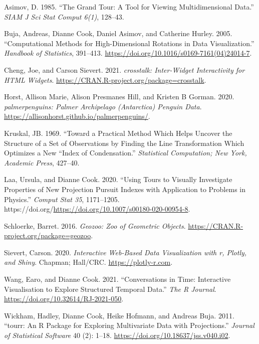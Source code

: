 \hypertarget{refs}{}
\begin{CSLReferences}{1}{0}
\leavevmode{}%
Asimov, D. 1985. {``The Grand Tour: A Tool for Viewing Multidimensional Data.''} \emph{SIAM J Sci Stat Comput 6(1)}, 128--43.

\leavevmode{}%
Buja, Andreas, Dianne Cook, Daniel Asimov, and Catherine Hurley. 2005. {``Computational Methods for High-Dimensional Rotations in Data Visualization.''} \emph{Handbook of Statistics}, 391--413. \url{https://doi.org/10.1016/s0169-7161(04)24014-7}.

\leavevmode{}%
Cheng, Joe, and Carson Sievert. 2021. \emph{{crosstalk}: Inter-Widget Interactivity for HTML Widgets}. \url{https://CRAN.R-project.org/package=crosstalk}.

\leavevmode{}%
Horst, Allison Marie, Alison Presmanes Hill, and Kristen B Gorman. 2020. \emph{{palmerpenguins}: Palmer Archipelago (Antarctica) Penguin Data}. \url{https://allisonhorst.github.io/palmerpenguins/}.

\leavevmode{}%
Kruskal, JB. 1969. {``Toward a Practical Method Which Helps Uncover the Structure of a Set of Observations by Finding the Line Transformation Which Optimizes a New ``Index of Condensation.''} \emph{Statistical Computation; New York, Academic Press}, 427--40.

\leavevmode{}%
Laa, Ursula, and Dianne Cook. 2020. {``Using Tours to Visually Investigate Properties of New Projection Pursuit Indexes with Application to Problems in Physics.''} \emph{Comput Stat 35}, 1171--1205. https://doi.org/\url{https://doi.org/10.1007/s00180-020-00954-8}.

\leavevmode{}%
Schloerke, Barret. 2016. \emph{Geozoo: Zoo of Geometric Objects}. \url{https://CRAN.R-project.org/package=geozoo}.

\leavevmode{}%
Sievert, Carson. 2020. \emph{{Interactive Web-Based Data Visualizatio}n with r, Plotly, and Shiny}. Chapman; Hall/CRC. \url{https://plotly-r.com}.

\leavevmode{}%
Wang, Earo, and Dianne Cook. 2021. {``Conversations in Time: Interactive Visualisation to Explore Structured Temporal Data.''} \emph{The R Journal}. \url{https://doi.org/10.32614/RJ-2021-050}.

\leavevmode{}%
Wickham, Hadley, Dianne Cook, Heike Hofmann, and Andreas Buja. 2011. {``{tourr}: An {R} Package for Exploring Multivariate Data with Projections.''} \emph{Journal of Statistical Software} 40 (2): 1--18. \url{https://doi.org/10.18637/jss.v040.i02}.

\end{CSLReferences}

